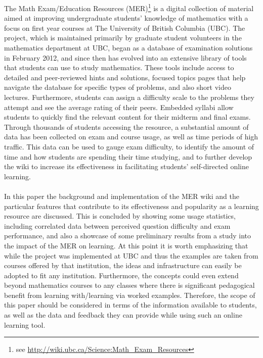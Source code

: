 \documentclass{primus}
\begin{document}
The Math Exam/Education Resources (MER)\footnote{see \url{http://wiki.ubc.ca/Science:Math_Exam_Resources}} is a digital collection of material aimed at improving undergraduate students’ knowledge of mathematics with a focus on first year courses at The University of British Columbia (UBC). The project, which is maintained primarily by graduate student volunteers in the mathematics department at UBC, began as a database of examination solutions in February 2012, and since then has evolved into an extensive library of tools that students can use to study mathematics. These tools include access to detailed and peer-reviewed hints and solutions, focused topics pages that help navigate the database for specific types of problems, and also short video lectures. Furthermore, students can assign a difficulty scale to the problems they attempt and see the average rating of their peers. Embedded syllabi allow students to quickly find the relevant content for their midterm and final exams. Through thousands of students accessing the resource, a substantial amount of data has been collected on exam and course usage, as well as time periods of high traffic. This data can be used to gauge exam difficulty, to identify the amount of time and how students are spending their time studying, and to further develop the wiki to increase its effectiveness in facilitating students’ self-directed online learning.
\\\\
\noindent{}In this paper the background and implementation of the MER wiki and the particular features that contribute to its effectiveness and popularity as a learning resource are discussed. This is concluded by showing some usage statistics, including correlated data between perceived question difficulty and exam performance, and also a showcase of some preliminary results from a study into the impact of the MER on learning.  At this point it is worth emphasizing that while the project was implemented at UBC and thus the examples are taken from courses offered by that institution, the ideas and infrastructure can easily be adopted to fit any institution.  Furthermore, the concepts could even extend beyond mathematics courses to any classes where there is significant pedagogical benefit from learning with/learning via worked examples.  Therefore, the scope of this paper should be considered in terms of the information available to students, as well as the data and feedback they can provide while using such an online learning tool. 
\end{document}
